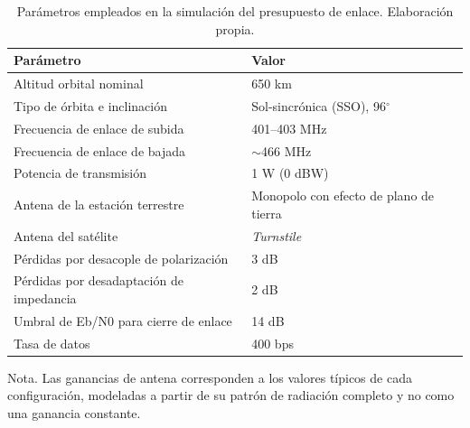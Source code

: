 
\begin{table}[H]
\centering
\begin{threeparttable}
\caption{Parámetros empleados en la simulación del presupuesto de
enlace. Elaboración propia.\vspace{1ex}}
\small
\begin{tabularx}{\textwidth}{@{}X l@{}}
\toprule
\textbf{Parámetro} & \textbf{Valor} \\
\midrule
Altitud orbital nominal                       & 650 km \\
Tipo de órbita e inclinación                  & Sol-sincrónica (SSO), 96$^{\circ}$ \\
Frecuencia de enlace de subida                & 401--403 MHz \\
Frecuencia de enlace de bajada                & $\sim$466 MHz \\
Potencia de transmisión                       & 1 W (0 dBW) \\
Antena de la estación terrestre               & Monopolo con efecto de plano de tierra \\
Antena del satélite                           & \textit{Turnstile} \\
Pérdidas por desacople de polarización        & 3 dB \\
Pérdidas por desadaptación de impedancia      & 2 dB \\
Umbral de Eb/N0 para cierre de enlace         & 14 dB \\
Tasa de datos                                 & 400 bps \\
\bottomrule
\end{tabularx}
\begin{tablenotes}[flushleft]\footnotesize
\item Nota. Las ganancias de antena corresponden a los valores típicos de cada
configuración, modeladas a partir de su patrón de radiación completo y no como
una ganancia constante.
\end{tablenotes}
\end{threeparttable}
\end{table}



